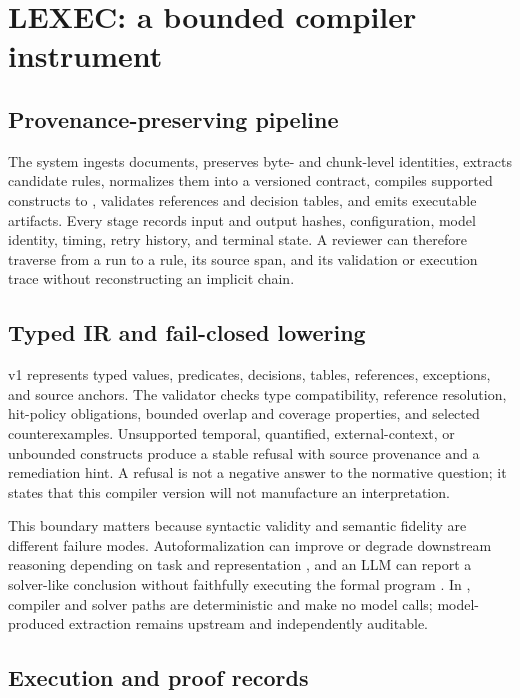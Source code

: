 \section{LEXEC: a bounded compiler instrument}

\subsection{Provenance-preserving pipeline}

The system ingests documents, preserves byte- and chunk-level identities,
extracts candidate rules, normalizes them into a versioned contract, compiles
supported constructs to \lexir{}, validates references and decision tables,
and emits executable artifacts. Every stage records input and output hashes,
configuration, model identity, timing, retry history, and terminal state. A
reviewer can therefore traverse from a run to a rule, its source span, and its
validation or execution trace without reconstructing an implicit chain.

\subsection{Typed IR and fail-closed lowering}

\lexir{} v1 represents typed values, predicates, decisions, tables, references,
exceptions, and source anchors. The validator checks type compatibility,
reference resolution, hit-policy obligations, bounded overlap and coverage
properties, and selected counterexamples. Unsupported temporal, quantified,
external-context, or unbounded constructs produce a stable refusal with source
provenance and a remediation hint. A refusal is not a negative answer to the
normative question; it states that this compiler version will not manufacture
an interpretation.

This boundary matters because syntactic validity and semantic fidelity are
different failure modes. Autoformalization can improve or degrade downstream
reasoning depending on task and representation \citep{ganguly2025grammars}, and
an LLM can report a solver-like conclusion without faithfully executing the
formal program \citep{wang2026limits}. In \lexec{}, compiler and solver paths
are deterministic and make no model calls; model-produced extraction remains
upstream and independently auditable.

\subsection{Execution and proof records}

